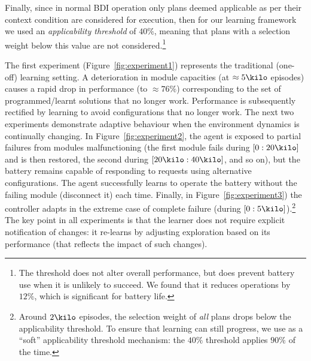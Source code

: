 Finally, since in normal BDI operation only plans deemed applicable as per their context condition are considered for execution, then for our learning framework we used an \emph{applicability threshold} of $40\%$, meaning that plans with a selection weight below this value are not considered.\footnote{The threshold does not alter overall performance, but does prevent battery use when it is unlikely to succeed. We found that it reduces operations by $12\%$, which is significant for battery life.}

The first experiment (Figure~\ref{fig:experiment1}) represents the traditional (one-off) learning setting. A deterioration in module capacities (at $\approx 5\kilo$ episodes) causes a rapid drop in performance (to $\approx 76\%$) corresponding to the set of programmed/learnt solutions that no longer work. Performance is subsequently rectified by learning to avoid configurations that no longer work. 
%
%
%
The next two experiments demonstrate adaptive behaviour when the environment dynamics is continually changing.
%
In Figure~\ref{fig:experiment2}, the agent is exposed to partial failures from modules malfunctioning (the first module fails during $[0:20\kilo]$ and is then restored, the second during $[20\kilo:40\kilo]$, and so on), but the battery remains capable of responding to requests using alternative configurations. The agent successfully learns to operate the battery without the failing module (disconnect it) each time.
%
Finally, in Figure~\ref{fig:experiment3}) the controller adapts in the extreme case of complete failure (during $[0:5\kilo]$).\footnote{Around $2\kilo$ episodes, the selection weight of {\em all} plans drops below the applicability threshold. To ensure that learning can still progress, we use as a ``soft'' applicability threshold mechanism: the $40\%$ threshold applies $90\%$ of the time.}
%
The key point in all experiments is that the learner does not require explicit notification of changes: it re-learns by adjusting exploration based on its performance (that reflects the impact of such changes).
